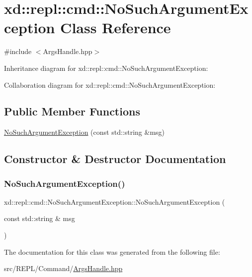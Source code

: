 \hypertarget{classxd_1_1repl_1_1cmd_1_1_no_such_argument_exception}{}\section{xd\+:\+:repl\+:\+:cmd\+:\+:No\+Such\+Argument\+Exception Class Reference}
\label{classxd_1_1repl_1_1cmd_1_1_no_such_argument_exception}


{\ttfamily \#include $<$Args\+Handle.\+hpp$>$}



Inheritance diagram for xd\+:\+:repl\+:\+:cmd\+:\+:No\+Such\+Argument\+Exception\+:


Collaboration diagram for xd\+:\+:repl\+:\+:cmd\+:\+:No\+Such\+Argument\+Exception\+:
\subsection*{Public Member Functions}
\begin{DoxyCompactItemize}
\item 
\mbox{\hyperlink{classxd_1_1repl_1_1cmd_1_1_no_such_argument_exception_a84f4e0f2b5600cfea7a1d65c4fc513f1}{No\+Such\+Argument\+Exception}} (const std\+::string \&msg)
\end{DoxyCompactItemize}


\subsection{Constructor \& Destructor Documentation}
\mbox{\label{classxd_1_1repl_1_1cmd_1_1_no_such_argument_exception_a84f4e0f2b5600cfea7a1d65c4fc513f1}} 
\subsubsection{\texorpdfstring{No\+Such\+Argument\+Exception()}{NoSuchArgumentException()}}
{\footnotesize\ttfamily xd\+::repl\+::cmd\+::\+No\+Such\+Argument\+Exception\+::\+No\+Such\+Argument\+Exception (\begin{DoxyParamCaption}\item[{const std\+::string \&}]{msg }\end{DoxyParamCaption})\hspace{0.3cm}{\ttfamily [inline]}}



The documentation for this class was generated from the following file\+:\begin{DoxyCompactItemize}
\item 
src/\+R\+E\+P\+L/\+Command/\mbox{\hyperlink{_args_handle_8hpp}{Args\+Handle.\+hpp}}\end{DoxyCompactItemize}
